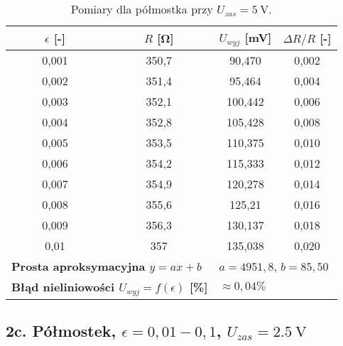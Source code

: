 \documentclass[12pt, a4paper]{article}
\begin{document}
	\begin{table}[H]
		\centering
		\caption{Pomiary dla półmostka przy $U_{zas} = \SI{5}{\volt}$.}
		\begin{tabular}{cccc}
			\toprule
			$\epsilon$ [-] & $R$ [\si{\ohm}] & $U_{wyj}$ [\si{\milli\volt}] & $\Delta R/R$ [-] \\
			\midrule
			0,001 & 350,7 & 90,470 & 0,002 \\
			0,002 & 351,4 & 95,464 & 0,004 \\
			0,003 & 352,1 & 100,442 & 0,006 \\
			0,004 & 352,8 & 105,428 & 0,008 \\
			0,005 & 353,5 & 110,375 & 0,010 \\
			0,006 & 354,2 & 115,333 & 0,012 \\
			0,007 & 354,9 & 120,278 & 0,014 \\
			0,008 & 355,6 & 125,21 & 0,016 \\
			0,009 & 356,3 & 130,137 & 0,018 \\
			0,01 & 357 & 135,038 & 0,020 \\
			\midrule
			\multicolumn{2}{l}{\textbf{Prosta aproksymacyjna $y = ax + b$}} & \multicolumn{2}{l}{$a = 4951,8$, $b = 85,50$} \\
			\multicolumn{2}{l}{\textbf{Błąd nieliniowości $U_{wyj} = f(\epsilon)$ [\%]}} & \multicolumn{2}{l}{$\approx 0,04 \%$} \\
			\bottomrule
		\end{tabular}
	\end{table}
	
	\subsection{2c. Półmostek, $\epsilon = 0,01-0,1$, $U_{zas} = \SI{2.5}{\volt}$}
	
\end{document}
